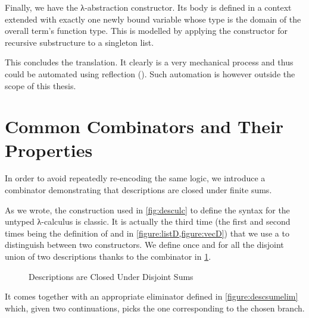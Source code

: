 Finally, we have the λ-abstraction constructor. Its body is defined in
a context extended with exactly one newly bound variable whose type is
the domain of the overall term's function type. This is modelled by
applying the constructor for recursive substructure to a singleton list.

\noindent\begin{minipage}[t]{0.4\textwidth}
\end{minipage}\begin{minipage}[t]{0.6\textwidth}
  \begin{AgdaSuppressSpace}
  \end{AgdaSuppressSpace}
\end{minipage}

This concludes the translation. It clearly is a very mechanical process
and thus could be automated using reflection
(\cite{DBLP:conf/ifl/WaltS12,thesis:christiansen}). Such automation is however
outside the scope of this thesis.

\section{Common Combinators and Their Properties}
\label{desccomb}

In order to avoid repeatedly re-encoding the same logic, we introduce
a combinator demonstrating that descriptions are closed under finite
sums.

As we wrote, the construction used in \cref{fig:desculc} to define the
syntax for the untyped λ-calculus is classic. It is actually the third
time (the first and second times being the definition of  and
 in \cref{figure:listD,figure:vecD}) that we use a 
to distinguish between two constructors. We define once and for all
the disjoint union of two descriptions thanks to the  combinator
in \cref{figure:descsum}.

\begin{figure}[h]
  \caption{Descriptions are Closed Under Disjoint Sums\label{figure:descsum}}
\end{figure}

It comes together with an appropriate eliminator  defined in
\cref{figure:descsumelim} which, given two continuations, picks the one
corresponding to the chosen branch.

